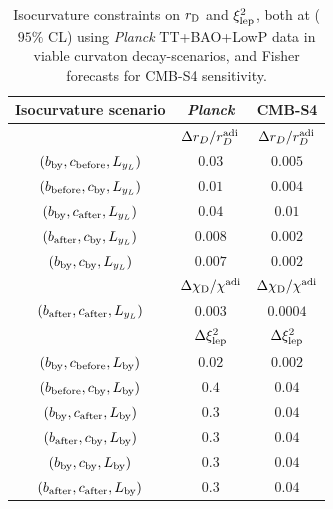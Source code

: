 \begin{table}[htbp!]
\begin{center}
\begin{tabular}{| c || c | c |}
\hline
{\rm Isocurvature scenario} &  \emph{Planck} & CMB-S4 \\ \hline \hline

  & $ \Delta r_D/r_{D}^{\rm adi}$ &$ \Delta r_D/r_{D}^{\rm adi}$\\ 
$(b_{\rm by},c_{\rm before},L_{y_{L}})$ & $0.03$&$0.005$\\
$(b_{\rm before},c_{\rm by},L_{y_{L}})$ &  $0.01$ &$0.004$\\
$(b_{\rm by},c_{\rm after},L_{y_{L}})$ &  $0.04$&$0.01$\\
$(b_{\rm after},c_{\rm by},L_{y_{L}})$ & $0.008$&$0.002$\\
$(b_{\rm by},c_{\rm by},L_{y_{L}})$ &  $0.007$&$0.002$\\ \hline 
& $\Delta \chi_{\rm D}/\chi_{\rm }^{\rm adi}$&$\Delta \chi_{\rm D}/\chi_{\rm }^{\rm adi}$ \\
$(b_{\rm after},c_{\rm after},L_{y_{L}})$ & $0.003$&$0.0004$ \\ \hline 
 &  $\Delta \xi^{2}_{\rm lep}$ &$\Delta \xi^{2}_{\rm lep}$\\
$(b_{\rm by},c_{\rm before},L_{\rm by})$ &$0.02$ &$0.002$\\
$(b_{\rm before},c_{\rm by},L_{\rm by})$ &$0.4$  & $0.04$\\
$(b_{\rm by},c_{\rm after},L_{\rm by})$ &$0.3$  &$0.04$\\
$(b_{\rm after},c_{\rm by},L_{\rm by})$ & $0.3$&$0.04$\\
$(b_{\rm by},c_{\rm by},L_{\rm by})$ & $0.3$ & $0.04$\\
$(b_{\rm after},c_{\rm after},L_{\rm by})$ & $0.3$ & $0.04$\\
\hline
\end{tabular}
\caption{Isocurvature constraints on $r_{\rm D}$ and $\xi_{\rm lep}^{2}$, both at ($95\%$ CL) using \textit{Planck} TT+BAO+LowP data \cite{Smith:2015bln} in viable curvaton decay-scenarios, and Fisher forecasts for CMB-S4 sensitivity. 
\label{limits_rd}}
\end{center}
\end{table}
%

